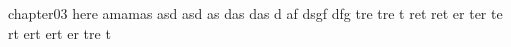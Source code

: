 chapter03 here amamas asd asd as das das d af dsgf dfg  tre tre t ret ret er ter te rt ert ert er tre t